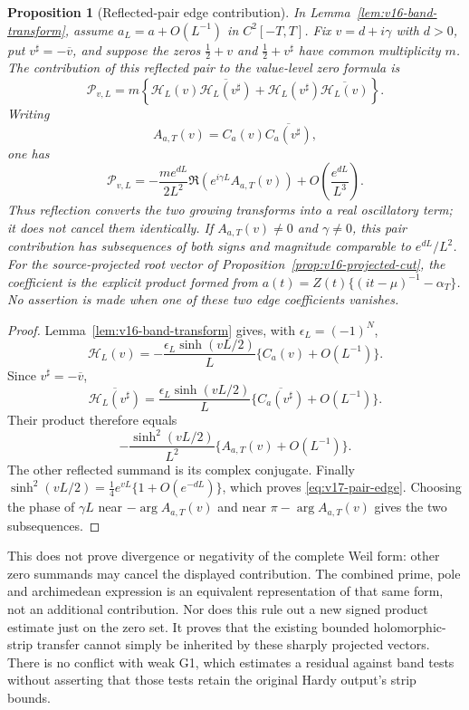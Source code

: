 \documentclass[11pt]{article}
\newtheorem{proposition}[theorem]{Proposition}
\theoremstyle{remark}
\begin{document}
\begin{proposition}[Reflected-pair edge contribution]
\label{prop:v17-pair-edge}
In Lemma~\ref{lem:v16-band-transform}, assume
$a_L=a+O(L^{-1})$ in $C^2[-T,T]$. Fix
$v=d+i\gamma$ with $d>0$, put $v^\sharp=-\overline v$, and suppose
the zeros $\tfrac12+v$ and $\tfrac12+v^\sharp$ have common
multiplicity $m$. The contribution of this reflected pair to the
value-level zero formula is
\[
 \mathcal P_{v,L}=m\left\{
 \mathcal H_L(v)\overline{\mathcal H_L(v^\sharp)}
 +\mathcal H_L(v^\sharp)\overline{\mathcal H_L(v)}\right\}.
\]
Writing
\[
 A_{a,T}(v)=C_a(v)\overline{C_a(v^\sharp)},
\]
one has
\begin{equation}\label{eq:v17-pair-edge}
 \boxed{
 \mathcal P_{v,L}
 =-\frac{m e^{dL}}{2L^2}
   \Re\!\left(e^{i\gamma L}A_{a,T}(v)\right)
   +O\!\left(\frac{e^{dL}}{L^3}\right).}
\end{equation}
Thus reflection converts the two growing transforms into a real
oscillatory term; it does not cancel them identically. If
$A_{a,T}(v)\ne0$ and $\gamma\ne0$, this pair contribution has
subsequences of both signs and magnitude comparable to $e^{dL}/L^2$.
For the source-projected root vector of
Proposition~\ref{prop:v16-projected-cut}, the coefficient is the explicit
product formed from $a(t)=Z(t)\{(it-\mu)^{-1}-\alpha_T\}$.
No assertion is made when one of these two edge coefficients vanishes.
\end{proposition}
\begin{proof}
Lemma~\ref{lem:v16-band-transform} gives, with
$\epsilon_L=(-1)^N$,
\[
 \mathcal H_L(v)=-\frac{\epsilon_L\sinh(vL/2)}L
                   \{C_a(v)+O(L^{-1})\}.
\]
Since $v^\sharp=-\overline v$,
\[
 \overline{\mathcal H_L(v^\sharp)}
 =\frac{\epsilon_L\sinh(vL/2)}L
       \{\overline{C_a(v^\sharp)}+O(L^{-1})\}.
\]
Their product therefore equals
\[
 -\frac{\sinh^2(vL/2)}{L^2}
  \{A_{a,T}(v)+O(L^{-1})\}.
\]
The other reflected summand is its complex conjugate. Finally
$\sinh^2(vL/2)=\tfrac14e^{vL}\{1+O(e^{-dL})\}$, which proves
\eqref{eq:v17-pair-edge}. Choosing the phase of $\gamma L$ near
$-\arg A_{a,T}(v)$ and near $\pi-\arg A_{a,T}(v)$ gives the two
subsequences.
\end{proof}

This does not prove divergence or negativity of the complete Weil form:
other zero summands may cancel the displayed contribution. The combined
prime, pole and archimedean expression is an equivalent representation
of that same form, not an additional contribution. Nor does this rule out a new
signed product estimate just on the zero set. It proves that the existing
bounded holomorphic-strip transfer cannot simply be inherited by these
sharply projected vectors. There is no conflict with weak G1, which
estimates a residual against band tests without asserting that those tests
retain the original Hardy output's strip bounds.
\end{document}

